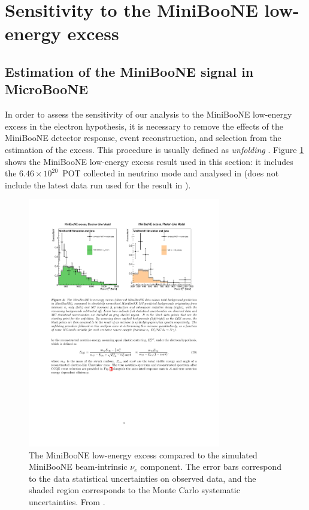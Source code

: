 \section{Sensitivity to the MiniBooNE low-energy excess}\label{sec:sensitivity}
\subsection{Estimation of the MiniBooNE signal in MicroBooNE}
In order to assess the sensitivity of our analysis to the MiniBooNE low-energy excess in the electron hypothesis, it is necessary to remove the effects of the MiniBooNE detector response, event reconstruction, and selection from the estimation of the excess. This procedure is usually defined as \emph{unfolding} \cite{lee_unfolding}. 
Figure \ref{fig:excess} shows the MiniBooNE low-energy excess result used in this section: it includes the $6.46\times10^{20}$~POT collected in neutrino mode and analysed in \cite{AguilarArevalo:2007it} (does not include the latest data run used for the result in \cite{Aguilar-Arevalo:2018gpe}).

\begin{figure}[htbp]
\centering
\includegraphics[width=0.75\textwidth]{figures/lee_excess.pdf} 
\caption{The MiniBooNE low-energy excess compared to the simulated MiniBooNE beam-intrinsic $\nu_e$ component. The error bars correspond to the data statistical uncertainties on observed data, and the shaded region corresponds to the Monte Carlo systematic uncertainties. From \cite{lee_unfolding}.} 
\label{fig:excess}
\end{figure}

